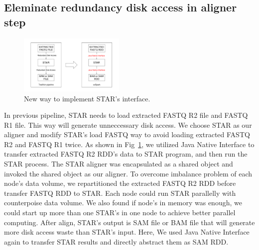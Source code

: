 \documentclass[conference]{IEEEtran}
\begin{document}
\subsection{Eleminate redundancy disk access in aligner step}
\begin{figure}
	\includegraphics[width=0.45\textwidth]{Fig2.pdf}
	\caption{New way to implement STAR's interface.} \label{fig2}
\end{figure}
In previous pipeline, STAR needs to load extracted FASTQ R2 file and FASTQ R1 file.
This way will generate unneccessary disk access. 
We choose STAR as our aligner and modify STAR's load FASTQ way to avoid loading extracted FASTQ R2 and FASTQ R1 twice. 
As shown in Fig~\ref{fig2}, we utilized Java Native Interface to transfer extracted FASTQ R2 RDD's data to STAR program, and then run the STAR process.
The STAR aligner was encapsulated as a shared object and invoked the shared object as our aligner. 
To overcome imbalance problem of each node's data volume, we repartitioned the extracted FASTQ R2 RDD before transfer FASTQ RDD to STAR.
Each node could run STAR parallelly with counterpoise data volume. 
We also found if node's in memory was enough, we could start up more than one STAR's in one node to achieve better parallel computing.
After align, STAR's output is SAM file or BAM file that will generate more disk access waste than STAR's input.
Here, We used Java Native Interface again to transfer STAR results and directly abstract them as SAM RDD. 
\end{document}
